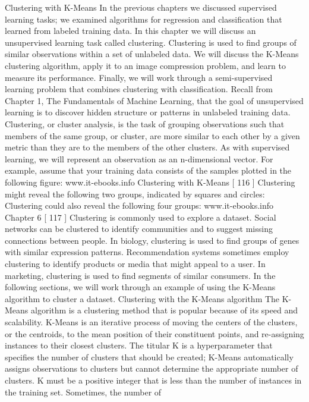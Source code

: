 Clustering with K-Means
In the previous chapters we discussed supervised learning tasks; we examined
algorithms for regression and classification that learned from labeled training data. In
this chapter we will discuss an unsupervised learning task called clustering. Clustering
is used to find groups of similar observations within a set of unlabeled data. We will
discuss the K-Means clustering algorithm, apply it to an image compression problem,
and learn to measure its performance. Finally, we will work through a semi-supervised
learning problem that combines clustering with classification.
Recall from Chapter 1, The Fundamentals of Machine Learning, that the goal of
unsupervised learning is to discover hidden structure or patterns in unlabeled training
data. Clustering, or cluster analysis, is the task of grouping observations such that
members of the same group, or cluster, are more similar to each other by a given
metric than they are to the members of the other clusters. As with supervised learning,
we will represent an observation as an n-dimensional vector. For example, assume that
your training data consists of the samples plotted in the following figure:
www.it-ebooks.info
Clustering with K-Means
[ 116 ]
Clustering might reveal the following two groups, indicated by squares and circles:
Clustering could also reveal the following four groups:
www.it-ebooks.info
Chapter 6
[ 117 ]
Clustering is commonly used to explore a dataset. Social networks can be clustered
to identify communities and to suggest missing connections between people. In
biology, clustering is used to find groups of genes with similar expression patterns.
Recommendation systems sometimes employ clustering to identify products or
media that might appeal to a user. In marketing, clustering is used to find segments
of similar consumers. In the following sections, we will work through an example of
using the K-Means algorithm to cluster a dataset.
Clustering with the K-Means algorithm
The K-Means algorithm is a clustering method that is popular because of its speed and
scalability. K-Means is an iterative process of moving the centers of the clusters, or the
centroids, to the mean position of their constituent points, and re-assigning instances
to their closest clusters. The titular K is a hyperparameter that specifies the number of
clusters that should be created; K-Means automatically assigns observations to clusters
but cannot determine the appropriate number of clusters. K must be a positive integer
that is less than the number of instances in the training set. Sometimes, the number of
